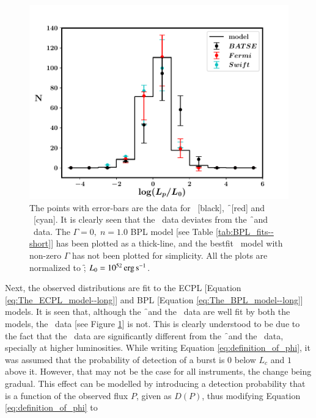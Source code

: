 \begin{figure}
\begin{center}
\includegraphics[scale=0.5]{BPL_model--joint--n=1}
\caption[Estimated luminosity distributions and model fit]{The points with error-bars are the data for \B\ [black], \f\ [red] and \s\ [cyan]. It is clearly seen that the \B\ data deviates from the \f\ and \s\ data. The $\Gamma = 0, \; n = 1.0$ BPL model [see Table \ref{tab:BPL_fits--short}] has been plotted as a thick-line, and the bestfit \B\ model with non-zero $\Gamma$ has not been plotted for simplicity. All the plots are normalized to \f; $L_0 = 10^{52} \, \rm erg \, s^{-1}$.}
\label{fig:data-vs-model}
\end{center}
\end{figure}


Next, the observed distributions are fit to the ECPL [Equation \ref{eq:The_ECPL_model--long}] and BPL [Equation \ref{eq:The_BPL_model--long}] models. It is seen that, although the \f\ and the \s\ data are well fit by both the models, the \B\ data [see Figure \ref{fig:data-vs-model}] is not. This is clearly understood to be due to the fact that the \B\ data are significantly different from the \f\ and the \s\ data, specially at higher luminosities. While writing Equation \ref{eq:definition_of_phi}, it was assumed that the probability of detection of a burst is $0$ below $L_c$ and $1$ above it. However, that may not be the case for all instruments, the change being gradual. This effect can be modelled by introducing a detection probability that is a function of the observed flux $P$, given as $D(P)$, thus modifying Equation \ref{eq:definition_of_phi} to

